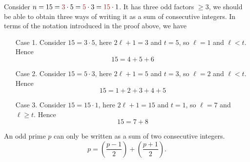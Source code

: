 \begin{example}
\begin{example}
Consider $n = 15 = {\color{firebrick}3}\cdot 5 = {\color{firebrick}5}\cdot 3 = {\color{firebrick}15} \cdot 1$. It has three odd factors $\geq 3$, we should be able to obtain three ways of writing it as a sum of consecutive integers. In terms of the notation introduced in the proof above, we have
\begin{itemize}[leftmargin=4em]
\item[Case 1.] Consider $15 = 3\cdot 5$, here $2\ell + 1 = 3$ and $t = 5$, so $\ell = 1$ and $\ell < t$. Hence
\[15 = 4 + 5 + 6\]
\item[Case 2.] Consider $15 = 5\cdot 3$, here $2\ell + 1 = 5$ and $t = 3$, so $\ell = 2$ and $\ell < t$. Hence
\[15 = 1 + 2 + 3 + 4 + 5\]
\item[Case 3.] Consider $15 = 15\cdot 1$, here $2\ell + 1 = 15$ and $t = 1$, so $\ell = 7$ and $\ell \geq t$. Hence
\[15 = 7 + 8\]
\end{itemize}
\end{example}
\end{example}

\vspace*{1em}

\begin{corollary}
An odd prime $p$ can only be written as a sum of two consecutive integers. \[p = \left(\dfrac{p-1}{2}\right) + \left(\dfrac{p+1}{2}\right).\]
\end{corollary}